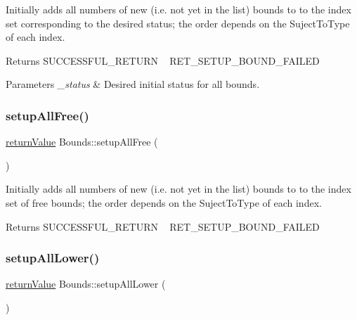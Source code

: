 Initially adds all numbers of new (i.\+e. not yet in the list) bounds to to the index set corresponding to the desired status; the order depends on the Suject\+To\+Type of each index. \begin{DoxyReturn}{Returns}
S\+U\+C\+C\+E\+S\+S\+F\+U\+L\+\_\+\+R\+E\+T\+U\+RN ~\newline
 R\+E\+T\+\_\+\+S\+E\+T\+U\+P\+\_\+\+B\+O\+U\+N\+D\+\_\+\+F\+A\+I\+L\+ED 
\end{DoxyReturn}

\begin{DoxyParams}{Parameters}
{\em \+\_\+status} & Desired initial status for all bounds. \\
\hline
\end{DoxyParams}
\mbox{\label{class_bounds_ae2f0eb4f34eb9a16b7d036ce23fa7ad0}} 
\subsubsection{\texorpdfstring{setup\+All\+Free()}{setupAllFree()}}
{\footnotesize\ttfamily \hyperlink{_message_handling_8hpp_a81d556f613bfbabd0b1f9488c0fa865e}{return\+Value} Bounds\+::setup\+All\+Free (\begin{DoxyParamCaption}{ }\end{DoxyParamCaption})}

Initially adds all numbers of new (i.\+e. not yet in the list) bounds to to the index set of free bounds; the order depends on the Suject\+To\+Type of each index. \begin{DoxyReturn}{Returns}
S\+U\+C\+C\+E\+S\+S\+F\+U\+L\+\_\+\+R\+E\+T\+U\+RN ~\newline
 R\+E\+T\+\_\+\+S\+E\+T\+U\+P\+\_\+\+B\+O\+U\+N\+D\+\_\+\+F\+A\+I\+L\+ED 
\end{DoxyReturn}
\mbox{\label{class_bounds_a3e87cf95718653034b86d021f70e45ac}} 
\subsubsection{\texorpdfstring{setup\+All\+Lower()}{setupAllLower()}}
{\footnotesize\ttfamily \hyperlink{_message_handling_8hpp_a81d556f613bfbabd0b1f9488c0fa865e}{return\+Value} Bounds\+::setup\+All\+Lower (\begin{DoxyParamCaption}{ }\end{DoxyParamCaption})}

